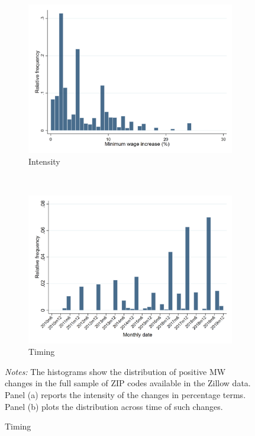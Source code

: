 \begin{figure}[h!]
    \centering
    \caption{Distribution of Minimum Wage Changes}
    \label{fig:distrib_mw_changes}
    \begin{subfigure}{.7\textwidth}
        \caption{Intensity}
        \includegraphics[width = \textwidth]
            {descriptive/estimation_samples/output/pct_ch_mw_dist}
    \end{subfigure}\\
    \begin{subfigure}{.7\textwidth}
        \caption{Timing}
        \includegraphics[width = \textwidth]
            {descriptive/estimation_samples/output/pct_ch_mw_date_dist}
    \end{subfigure}

    \begin{minipage}{.95\textwidth} \footnotesize
        \vspace{3mm}
        \textit{Notes:} The histograms show the distribution of positive MW changes 
        in the full sample of ZIP codes available in the Zillow data. Panel (a) reports 
        the intensity of the changes in percentage terms. Panel (b) plots the distribution 
        across time of such changes. 
    \end{minipage}
\end{figure}

